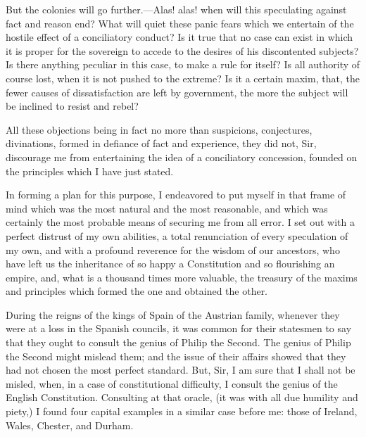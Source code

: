 But the colonies will go further.—Alas! alas! when will this speculating against fact and reason end? What will quiet these panic fears which we entertain of the hostile effect of a conciliatory conduct? Is it true that no case can exist in which it is proper for the sovereign to accede to the desires of his discontented subjects? Is there anything peculiar in this case, to make a rule for itself? Is all authority of course lost, when it is not pushed to the extreme? Is it a certain maxim, that, the fewer causes of dissatisfaction are left by government, the more the subject will be inclined to resist and rebel?

All these objections being in fact no more than suspicions, conjectures, divinations, formed in defiance of fact and experience, they did not, Sir, discourage me from entertaining the idea of a conciliatory concession, founded on the principles which I have just stated.

In forming a plan for this purpose, I endeavored to put myself in that frame of mind which was the most natural and the most reasonable, and which was certainly the most probable means of securing me from all error. I set out with a perfect distrust of my own abilities, a total renunciation of every speculation of my own, and with a profound reverence for the wisdom of our ancestors, who have left us the inheritance of so happy a Constitution and so flourishing an empire, and, what is a thousand times more valuable, the treasury of the maxims and principles which formed the one and obtained the other.

During the reigns of the kings of Spain of the Austrian family, whenever they were at a loss in the Spanish councils, it was common for their statesmen to say that they ought to consult the genius of Philip the Second. The genius of Philip the Second might mislead them; and the issue of their affairs showed that they had not chosen the most perfect standard. But, Sir, I am sure that I shall not be misled, when, in a case of constitutional difficulty, I consult the genius of the English Constitution. Consulting at that oracle, (it was with all due humility and piety,) I found four capital examples in a similar case before me: those of Ireland, Wales, Chester, and Durham.

